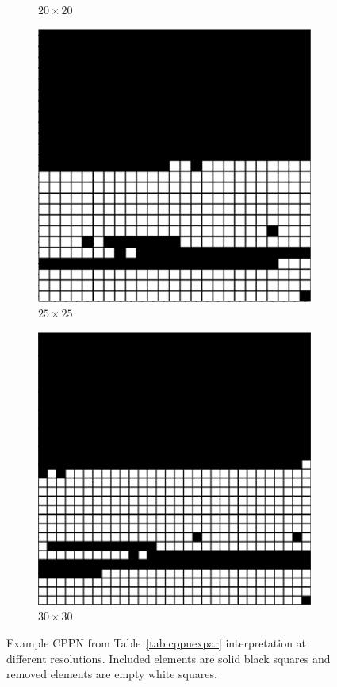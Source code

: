 \begin{figure}[H]
\begin{subfigure}[t]{0.4\textwidth}
		\caption{$20\times 20$}
	\end{subfigure}
	\hfill
	\begin{subfigure}[t]{0.4\textwidth}
		\centering
		\includegraphics[width=\textwidth]{cppn_25x25.png}
		\caption{$25\times 25$}
	\end{subfigure}
	\hfill
	\begin{subfigure}[t]{0.4\textwidth}
		\centering
		\includegraphics[width=\textwidth]{cppn_30x30.png}
		\caption{$30\times 30$}
	\end{subfigure}
	\caption[Example CPPN interpretation at different resolutions]{Example CPPN from Table~\ref{tab:cppnexpar} interpretation at different resolutions. Included elements are solid black squares and removed elements are empty white squares.}
	\label{fig:cppnintres}
\end{figure}

